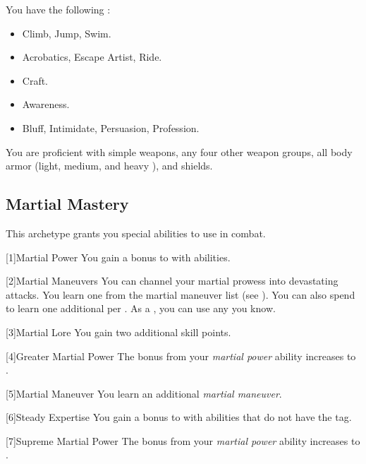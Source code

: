        You have the following :
        \begin{itemize}
            \item {} Climb, Jump, Swim.
            \item {} Acrobatics, Escape Artist, Ride.
            \item {} Craft.
            \item {} Awareness.
            \item {} Bluff, Intimidate, Persuasion, Profession.
        \end{itemize}

        You are proficient with simple weapons, any four other weapon groups, all body armor (light, medium, and heavy ), and shields.

    \subsection{Martial Mastery}
        This archetype grants you special abilities to use in combat.

        [1]{Martial Power} You gain a  bonus to  with  abilities.

        [2]{Martial Maneuvers}
        You can channel your martial prowess into devastating attacks.
        You learn one  from the martial maneuver list (see ).
        You can also spend  to learn one additional  per .
        As a , you can use any  you know.

        [3]{Martial Lore} You gain two additional skill points.

        [4]{Greater Martial Power} The bonus from your \textit{martial power} ability increases to .

        [5]{Martial Maneuver}
        You learn an additional \textit{martial maneuver}.

        [6]{Steady Expertise} You gain a  bonus to  with  abilities that do not have the  tag.

        [7]{Supreme Martial Power} The bonus from your \textit{martial power} ability increases to .

